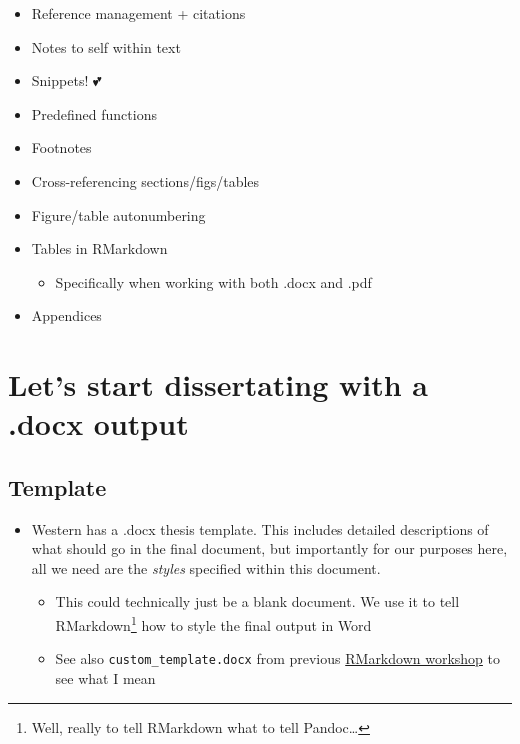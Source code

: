 \documentclass[
  12pt,
  oneside]{book}
\providecommand{\tightlist}{%
  \setlength{\itemsep}{0pt}\setlength{\parskip}{0pt}}
\numberwithin{figure}{chapter}
\begin{document}
\begin{itemize}
\tightlist
\item
  Reference management + citations
\item
  Notes to self within text
\item
  Snippets! 💕
\item
  Predefined functions
\item
  Footnotes
\item
  Cross-referencing sections/figs/tables
\item
  Figure/table autonumbering
\item
  Tables in RMarkdown

  \begin{itemize}
  \tightlist
  \item
    Specifically when working with both .docx and .pdf
  \end{itemize}
\item
  Appendices
\end{itemize}

\hypertarget{lets-start-dissertating-with-a-.docx-output}{%
\section{Let's start dissertating with a .docx output}\label{lets-start-dissertating-with-a-.docx-output}}

\hypertarget{template}{%
\subsection{Template}\label{template}}

\begin{itemize}
\tightlist
\item
  Western has a .docx thesis template. This includes detailed descriptions of what should go in the final document, but importantly for our purposes here, all we need are the \emph{styles} specified within this document.

  \begin{itemize}
  \tightlist
  \item
    This could technically just be a blank document. We use it to tell RMarkdown\footnote{Well, really to tell RMarkdown what to tell Pandoc\ldots{}} how to style the final output in Word
  \item
    See also \texttt{custom\_template.docx} from previous \href{LINK}{RMarkdown workshop} to see what I mean
  \end{itemize}
\end{itemize}
\end{document}
